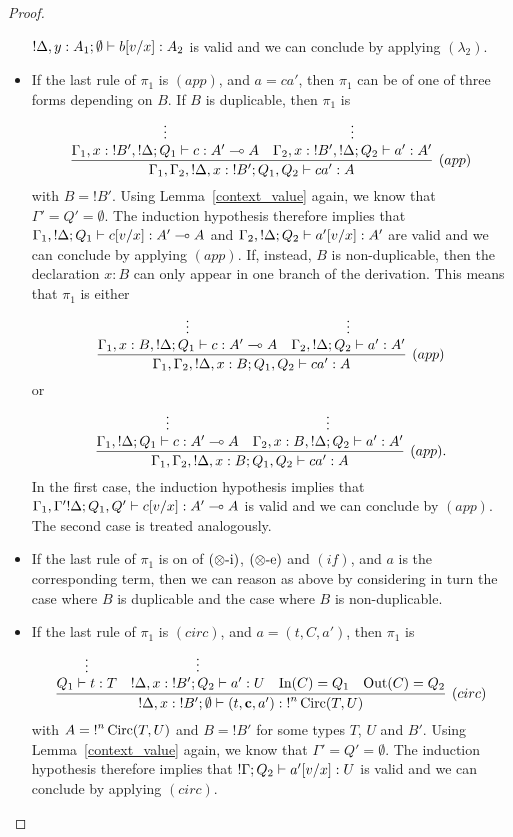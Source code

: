\documentclass[twoside]{article}
\begin{document}
\begin{proof}
\begin{itemize}
 ${!}\Delta,y:A_1;\emptyset \vdash b[v/x]:A_2$ is valid and we can conclude
 by applying $(\lambda_2)$.
 \item If the last rule of $\pi_1$ is $(app)$, and $a=ca'$, then $\pi_1$ can 
 be of one of three forms depending on $B$. If $B$ is duplicable, then $\pi_1$ is
 \[
 \infer[(app)]{\Gamma_1,\Gamma_2,{!}\Delta,x:{!}B';Q_1,Q_2\entails ca':A}{
    \deduce[]{\Gamma_1, x:{!}B',{!}\Delta;Q_1\entails c:A'\loli A}{
      \vdots
    }
    &
    \deduce[]{\Gamma_2, x:{!}B',{!}\Delta ;Q_2\entails a':A' }{
      \vdots
    }
 }
 \]
 with $B={!}B'$. Using 
 Lemma~\hyperref[context_value]{\ref*{context_value}} again, we 
 know that $\Gamma'=Q'=\emptyset$. The induction hypothesis therefore 
 implies that $\Gamma_1,{!}\Delta;Q_1\vdash c[v/x]:A'\multimap A$ and 
 $\Gamma_2,{!}\Delta ;Q_2\vdash a'[v/x]:A'$ are valid and we can conclude 
 by applying $(app)$. If, instead, $B$ is non-duplicable, then the declaration 
 $x:B$ can only appear in one branch of the derivation. This means that $\pi_1$ 
 is either 
  \[
 \infer[(app)]{\Gamma_1,\Gamma_2,{!}\Delta,x:B;Q_1,Q_2\entails ca':A}{
    \deduce[]{\Gamma_1, x:B,{!}\Delta;Q_1\entails c:A'\loli A}{
      \vdots
    }
    &
    \deduce[]{\Gamma_2, {!}\Delta ;Q_2\entails a':A'}{
      \vdots
    }     
 }
 \]
 or
  \[
 \infer[(app).]{\Gamma_1,\Gamma_2,{!}\Delta,x:B;Q_1,Q_2\entails ca':A}{
    \deduce[]{\Gamma_1, {!}\Delta;Q_1\entails c:A'\loli A}{ 
      \vdots
    }
    &
    \deduce[]{\Gamma_2, x:B,{!}\Delta ;Q_2\entails a':A'}{
      \vdots
    }     
 }
 \]
 In the first case, the induction hypothesis implies that 
 $\Gamma_1,\Gamma' {!}\Delta;Q_1,Q'\vdash c[v/x]:A'\multimap A$ is valid and 
 we can conclude by $(app)$. The second case is treated analogously.
 \item If the last rule of $\pi_1$ is on of $(\otimes\mbox{-i})$, $(\otimes\mbox{-e})$ 
 and $(if)$, and $a$ is the corresponding term, then we can reason as above
 by considering in turn the case where $B$ is duplicable and the case where
 $B$ is non-duplicable.
 \item If the last rule of $\pi_1$ is $(circ)$, and $a=(t,C,a')$, then 
 $\pi_1$ is
 \[
 \infer[(circ)]{{!}\Delta,x:{!}B';\emptyset \entails (t,\mathbf{c},a'):{!}^n\Circ(T,U)}{
    \deduce[]{Q_1\entails t:T}{
      \vdots
    }    
    &
    \deduce[]{{!}\Delta,x:{!}B' ; Q_2\entails a':U}{
      \vdots
    }     
    &
    \In(C)=Q_1 
    &
    \Out(C)=Q_2
 }
 \]
 with $A={!}^n\mathop{\textrm{Circ}}\nolimits(T,U)$ and $B={!}B'$ for some types $T$, $U$ and $B'$. Using  
 Lemma~\hyperref[context_value]{\ref*{context_value}} again, we know 
 that $\Gamma'=Q'=\emptyset$. The induction hypothesis therefore implies that
 ${!}\Gamma; Q_2\vdash a'[v/x]:U$ is valid and we can conclude
 by applying $(circ)$.
\end{itemize}
\end{proof}
\end{document}
